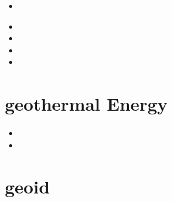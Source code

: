 \begin{small}
\begin{itemize}
 \\
 \\
 \\
\item[\twothousandtwentyone]
  \\ 
\item[\twothousandtwentytwo]
\item[\twothousandtwentythree]
\item[\twothousandtwentyfour]
\item[\twothousandtwentysix] 
\end{itemize}
\end{small}







\section{geothermal Energy} 

\begin{small}
\begin{itemize}
\item[\twothousandfifteen]
\item[\twothousandnineteen]
\end{itemize}
\end{small}


\section{geoid}

